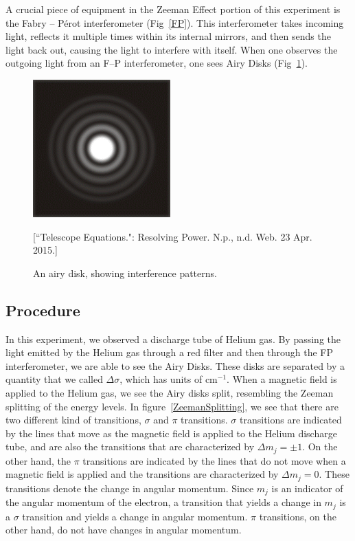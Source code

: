 A crucial piece of equipment in the Zeeman Effect portion of this experiment is the Fabry -- P\'{e}rot interferometer (Fig~\ref{FP}). This interferometer takes incoming light, reflects it multiple times within its internal mirrors, and then sends the light back out, causing the light to interfere with itself. When one observes the outgoing light from an F--P interferometer, one sees Airy Disks (Fig~\ref{AiryDisk}).

\begin{figure}[h]
  \includegraphics[width = 5 cm]{AiryDisk.png}
  \begin{center}
  \caption{An airy disk, showing interference patterns.}[\footnotesize{``Telescope Equations.": Resolving Power. N.p., n.d. Web. 23 Apr. 2015.}]
  \label{AiryDisk}
  \end{center}
\end{figure}

\subsection{Procedure}

In this experiment, we observed a discharge tube of Helium gas. By passing the light emitted by the Helium gas through a red filter and then through the FP interferometer, we are able to see the Airy Disks. These disks are separated by a quantity that we called $\Delta \sigma$, which has units of cm$^{-1}$. When a magnetic field is applied to the Helium gas, we see the Airy disks split, resembling the Zeeman splitting of the energy levels. In figure~\ref{ZeemanSplitting}, we see that there are two different kind of transitions, $\sigma$ and $\pi$ transitions. $\sigma$ transitions are indicated by the lines that move as the magnetic field is applied to the Helium discharge tube, and are also the transitions that are characterized by $\Delta m_{j} = \pm 1$. On the other hand, the $\pi$ transitions are indicated by the lines that do not move when a magnetic field is applied and the transitions are characterized by $\Delta m_{j} = 0$.
These transitions denote the change in angular momentum. Since $m_j$ is an indicator of the angular momentum of the electron, a transition that yields a change in $m_j$ is a $\sigma$ transition and yields a change in angular momentum. $\pi$ transitions, on the other hand, do not have changes in angular momentum. 

